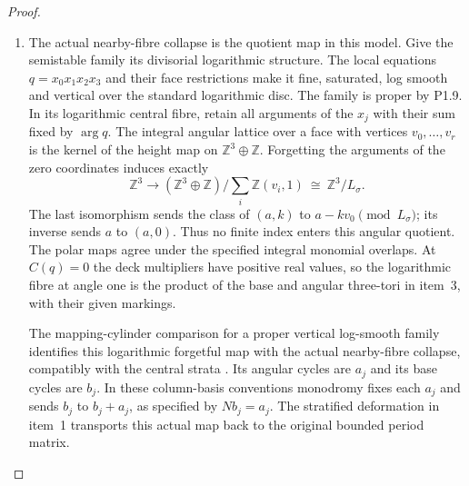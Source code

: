 \begin{proof}
\begin{enumerate}[label=\arabic*.]
The period deck map is $(a,k)\mapsto(a+k\nu,k)$, sending $v$ to
$v+\nu$.  Its component marking is unchanged because
$a+k\nu-k(v+\nu)=a-kv$.
Moreover $\mathcal A_{v+\nu}=\mathcal A_v+2G\nu$; the common
character factor cancels in projective ratios.  Hence
\[
 \mu_{v+\nu}(T_\nu p)=\mu_v(p)+G\nu,
 \qquad s_{v+\nu}(y+G\nu)=T_\nu s_v(y).
\]
These give an explicit well-defined map
\[
 \begin{gathered}
 \mathcal Q=
 \bigl((\mathbb R^3/G\mathbb Z^3)\times
       (\mathbb R^3/\mathbb Z^3)\bigr)/\!\sim
 \longrightarrow C,\\
 [y,\theta]\longmapsto e^{2\pi i\theta}\,s_v(y)
 \quad(y\in P_v).
 \end{gathered}
\]
where over $\operatorname{relint}D_\sigma$ the relation collapses
the subtorus $L_\sigma\otimes(\mathbb R/\mathbb Z)$.
On each stratum the inverse takes its moment value and its angular
character class in $T_A/T_{L_\sigma}$; the latter is obtained by
$z\mapsto z/|z|$ on its nonzero characters.
The map is a continuous bijection, and its source is compact and
$C$ Hausdorff, so it is a homeomorphism.
The angular identity $[y,0]$ gives the continuous section, with
the same face and deck compatibilities just proved.

\item The actual nearby-fibre collapse is the quotient map in this model.
Give the semistable family its divisorial logarithmic structure.
The local equations $q=x_0x_1x_2x_3$ and their face restrictions
make it fine, saturated, log smooth and vertical over the standard
logarithmic disc.  The family is proper by P1.9.
In its logarithmic central fibre, retain all arguments of the $x_j$
with their sum fixed by $\arg q$.  The integral angular lattice over
a face with vertices $v_0,\ldots,v_r$ is the kernel of the height
map on $\mathbb Z^3\oplus\mathbb Z$.  Forgetting the arguments of
the zero coordinates induces exactly
\[
 \mathbb Z^3\longrightarrow
 (\mathbb Z^3\oplus\mathbb Z)/
       \sum_i\mathbb Z(v_i,1)
 \ \cong\ \mathbb Z^3/L_\sigma.
\]
The last isomorphism sends the class of $(a,k)$ to
$a-kv_0\pmod {L_\sigma}$; its inverse sends $a$ to $(a,0)$.
Thus no finite index enters this angular quotient.
The polar maps agree under the specified integral monomial overlaps.
At $C(q)=0$ the deck multipliers have positive real values, so the
logarithmic fibre at angle one is the product of the base and angular
three-tori in item~3, with their given markings.

The mapping-cylinder comparison for a proper vertical log-smooth
family identifies this logarithmic forgetful map with the actual
nearby-fibre collapse, compatibly with the central strata
\cite[formula (3-3-1), p.~478; Theorem 4.1.1 and Lemmas
4.1.2--4.1.3, pp.~480--482]{ffAchingerOgus20}.
Its angular cycles are $a_j$ and its base cycles are $b_j$.
In these column-basis conventions monodromy fixes each $a_j$
and sends $b_j$ to $b_j+a_j$, as specified by $Nb_j=a_j$.
The stratified deformation in item~1 transports this actual map
back to the original bounded period matrix.


\end{enumerate}
\end{proof}
